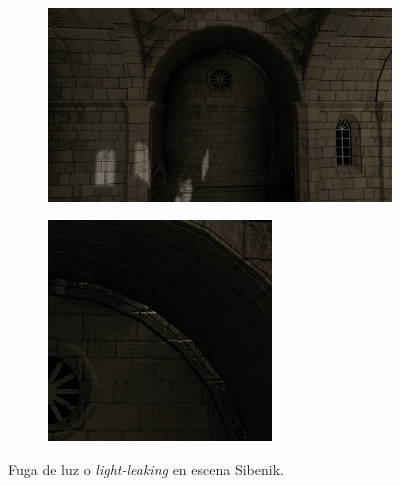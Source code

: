 \begin{figure}[H]
	\centering
	\centering
	\begin{subfigure}[b]{0.623\linewidth}
		\centering
		\captionsetup{justification=centering}
		\includegraphics[width=\linewidth]{media/leaking.png}
	\end{subfigure}%
	\hspace{0.01\textwidth}
	\begin{subfigure}[b]{0.357\linewidth}
		\centering
		\captionsetup{justification=centering}
		\includegraphics[width=\linewidth]{media/leaking_detail.png}
	\end{subfigure}%
	\caption{Fuga de luz o \emph{light-leaking} en escena Sibenik.}
	\label{fig:leaking}
\end{figure}

